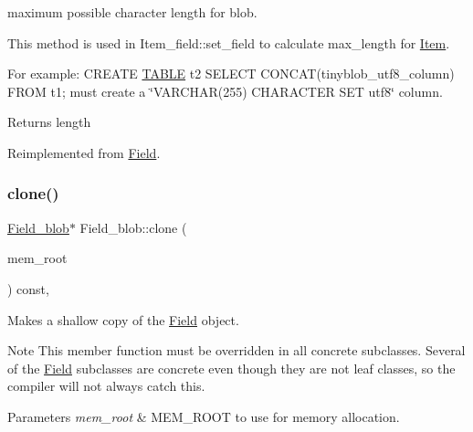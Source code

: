 maximum possible character length for blob.

This method is used in Item\+\_\+field\+::set\+\_\+field to calculate max\+\_\+length for \mbox{\hyperlink{classItem}{Item}}.

For example\+: C\+R\+E\+A\+TE \mbox{\hyperlink{structTABLE}{T\+A\+B\+LE}} t2 S\+E\+L\+E\+CT C\+O\+N\+C\+A\+T(tinyblob\+\_\+utf8\+\_\+column) F\+R\+OM t1; must create a \char`\"{}\+V\+A\+R\+C\+H\+A\+R(255) C\+H\+A\+R\+A\+C\+T\+E\+R S\+E\+T utf8\char`\"{} column.

\begin{DoxyReturn}{Returns}
length 
\end{DoxyReturn}


Reimplemented from \mbox{\hyperlink{classField}{Field}}.

\mbox{\label{classField__blob_adb81abc88601964eb822c176bd192c6a}} 
\subsubsection{\texorpdfstring{clone()}{clone()}\hspace{0.1cm}{\footnotesize\ttfamily [1/2]}}
{\footnotesize\ttfamily \mbox{\hyperlink{classField__blob}{Field\+\_\+blob}}$\ast$ Field\+\_\+blob\+::clone (\begin{DoxyParamCaption}\item[{M\+E\+M\+\_\+\+R\+O\+OT $\ast$}]{mem\+\_\+root }\end{DoxyParamCaption}) const\hspace{0.3cm}{\ttfamily [inline]}, {\ttfamily [virtual]}}

Makes a shallow copy of the \mbox{\hyperlink{classField}{Field}} object.

\begin{DoxyNote}{Note}
This member function must be overridden in all concrete subclasses. Several of the \mbox{\hyperlink{classField}{Field}} subclasses are concrete even though they are not leaf classes, so the compiler will not always catch this.
\end{DoxyNote}

\begin{DoxyParams}{Parameters}
{\em mem\+\_\+root} & M\+E\+M\+\_\+\+R\+O\+OT to use for memory allocation. \\
\hline
\end{DoxyParams}

